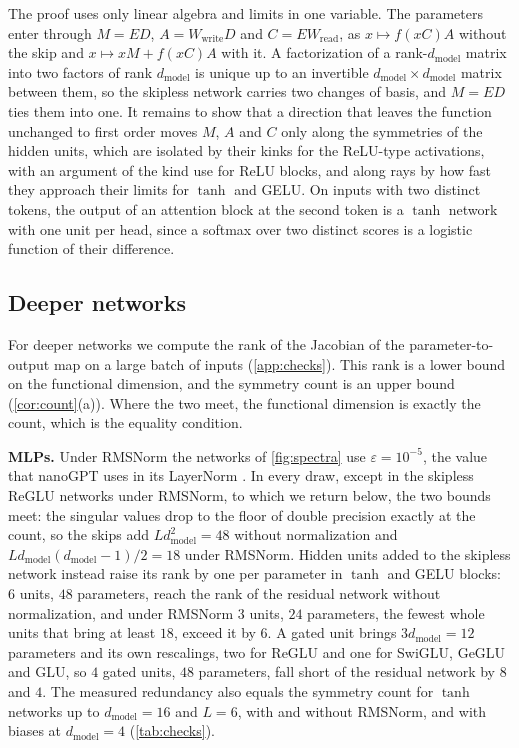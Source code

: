 \documentclass[10pt]{article}
\theoremstyle{definition}
\theoremstyle{remark}
\newcommand{\Wread}{W_{\mathrm{read}}}
\newcommand{\Wwrite}{W_{\mathrm{write}}}
\newcommand{\dm}{d_{\mathrm{model}}}
\newcommand{\para}[1]{\smallskip\noindent\textbf{#1}\hspace{0.5em}}
\begin{document}
The proof uses only linear algebra and limits in one variable. The parameters enter through $M = ED$, $A = \Wwrite D$ and $C = E\Wread$, as $x \mapsto f(xC)A$ without the skip and $x \mapsto xM + f(xC)A$ with it. A factorization of a rank-$\dm$ matrix into two factors of rank $\dm$ is unique up to an invertible $\dm \times \dm$ matrix between them, so the skipless network carries two changes of basis, and $M = ED$ ties them into one. It remains to show that a direction that leaves the function unchanged to first order moves $M$, $A$ and $C$ only along the symmetries of the hidden units, which are isolated by their kinks for the ReLU-type activations, with an argument of the kind \citet{mijoski2026absorb} use for ReLU blocks, and along rays by how fast they approach their limits for $\tanh$ and GELU. On inputs with two distinct tokens, the output of an attention block at the second token is a $\tanh$ network with one unit per head, since a softmax over two distinct scores is a logistic function of their difference.

\subsection{Deeper networks}\label{sec:measured}

For deeper networks we compute the rank of the Jacobian of the parameter-to-output map on a large batch of inputs (\cref{app:checks}). This rank is a lower bound on the functional dimension, and the symmetry count is an upper bound (\cref{cor:count}(a)). Where the two meet, the functional dimension is exactly the count, which is the equality condition.


\para{MLPs.} Under RMSNorm the networks of \cref{fig:spectra} use $\varepsilon = 10^{-5}$, the value that nanoGPT uses in its LayerNorm \citep{karpathy2023nanogpt}. In every draw, except in the skipless ReGLU networks under RMSNorm, to which we return below, the two bounds meet: the singular values drop to the floor of double precision exactly at the count, so the skips add $L\dm^2 = 48$ without normalization and $L\dm(\dm-1)/2 = 18$ under RMSNorm. Hidden units added to the skipless network instead raise its rank by one per parameter in $\tanh$ and GELU blocks: $6$ units, $48$ parameters, reach the rank of the residual network without normalization, and under RMSNorm $3$ units, $24$ parameters, the fewest whole units that bring at least $18$, exceed it by $6$. A gated unit brings $3\dm = 12$ parameters and its own rescalings, two for ReGLU and one for SwiGLU, GeGLU and GLU, so $4$ gated units, $48$ parameters, fall short of the residual network by $8$ and $4$. The measured redundancy also equals the symmetry count for $\tanh$ networks up to $\dm = 16$ and $L = 6$, with and without RMSNorm, and with biases at $\dm = 4$ (\cref{tab:checks}).
\end{document}

